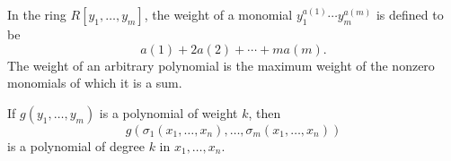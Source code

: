 In the ring $R[y_1, \ldots, y_m]$, the weight of a monomial $y_1^{a(1)} \cdots y_m^{a(m)}$ is defined to be
$$
a(1) + 2a(2) + \cdots + ma(m).
$$
The weight of an arbitrary polynomial is the maximum weight of the nonzero monomials of which it is a sum.

If $g(y_1, \ldots, y_m)$ is a polynomial of weight $k$, then
$$
g(\sigma_1(x_1, \ldots, x_n), \ldots, \sigma_m(x_1, \ldots, x_n))
$$
is a polynomial of degree $k$ in $x_1, \ldots, x_n$.
